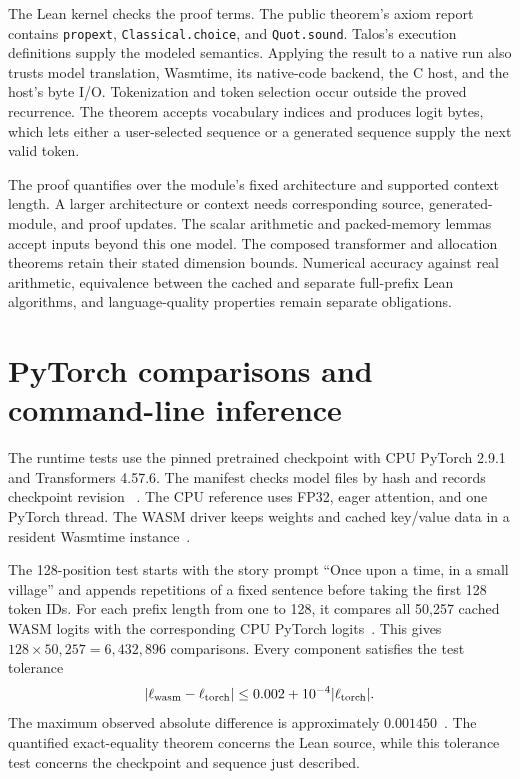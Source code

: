 \documentclass[11pt]{article}
\newcommand{\code}[1]{\texttt{#1}}
\newcommand{\longcode}[1]{\texttt{\seqsplit{#1}}}
\begin{document}
The Lean kernel checks the proof terms.  The public theorem's axiom report contains \code{propext}, \code{Classical.choice}, and \code{Quot.sound}.  Talos's execution definitions supply the modeled semantics.  Applying the result to a native run also trusts model translation, Wasmtime, its native-code backend, the C host, and the host's byte I/O.  Tokenization and token selection occur outside the proved recurrence.  The theorem accepts vocabulary indices and produces logit bytes, which lets either a user-selected sequence or a generated sequence supply the next valid token.

The proof quantifies over the module's fixed architecture and supported context length.  A larger architecture or context needs corresponding source, generated-module, and proof updates.  The scalar arithmetic and packed-memory lemmas accept inputs beyond this one model.  The composed transformer and allocation theorems retain their stated dimension bounds.  Numerical accuracy against real arithmetic, equivalence between the cached and separate full-prefix Lean algorithms, and language-quality properties remain separate obligations.

\section{PyTorch comparisons and command-line inference}\label{sec:tests}

The runtime tests use the pinned pretrained checkpoint with CPU PyTorch 2.9.1 and Transformers 4.57.6.  The manifest checks model files by hash and records checkpoint revision \longcode{607a30d783dfa663caf39e06633721c8d4cfcd7e}~\cite{manifest}.  The CPU reference uses FP32, eager attention, and one PyTorch thread.  The WASM driver keeps weights and cached key/value data in a resident Wasmtime instance~\cite{driver}.

The 128-position test starts with the story prompt ``Once upon a time, in a small village'' and appends repetitions of a fixed sentence before taking the first 128 token IDs.  For each prefix length from one to 128, it compares all 50,257 cached WASM logits with the corresponding CPU PyTorch logits~\cite{testcode}.  This gives $128\times50{,}257=6{,}432{,}896$ comparisons.  Every component satisfies the test tolerance
\[
|\ell_{\rm wasm}-\ell_{\rm torch}|
\leq 0.002+10^{-4}|\ell_{\rm torch}|.
\]
The maximum observed absolute difference is approximately $0.001450$~\cite{tests}.  The quantified exact-equality theorem concerns the Lean source, while this tolerance test concerns the checkpoint and sequence just described.
\end{document}
